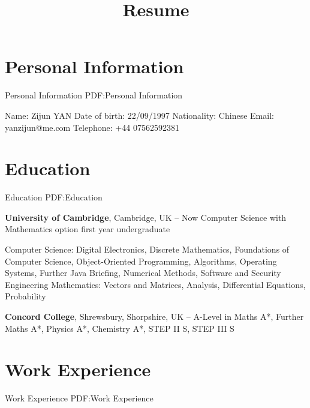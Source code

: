 \documentclass[letterpaper,10pt,oneside]{article}
\begin{document}
\title{Resume}

\begin{body}

\section
{Personal Information}
{Personal Information}
{PDF:Personal Information}

Name: Zijun YAN \newline
Date of birth: 22/09/1997 \newline
Nationality: Chinese\newline
Email: yanzijun@me.com\newline
Telephone: +44 07562592381

\section 
{Education}
{Education}
{PDF:Education}

\textbf{University of Cambridge},
Cambridge, UK
\hfill
{} --
Now
\GapNoBreak
\BulletItem
Computer Science with Mathematics option first year undergraduate
\GapNoBreak
\begin{detail}
\SubBulletItem
Computer Science: Digital Electronics, Discrete Mathematics, Foundations of Computer Science, Object-Oriented Programming, Algorithms, Operating Systems, Further Java Briefing, Numerical Methods, Software and Security Engineering
\SubBulletItem
Mathematics: Vectors and Matrices, Analysis, Differential Equations, Probability
\end{detail}



\BigGap
\textbf{Concord College},
Shrewsbury, Shorpshire, UK
\hfill
{} --
\GapNoBreak
\BulletItem
A-Level in Maths A*, Further Maths A*, Physics A*, Chemistry A*, STEP II S, STEP III S

\section
{Work Experience}
{Work Experience}
{PDF:Work Experience}


\end{body}
\end{document}
